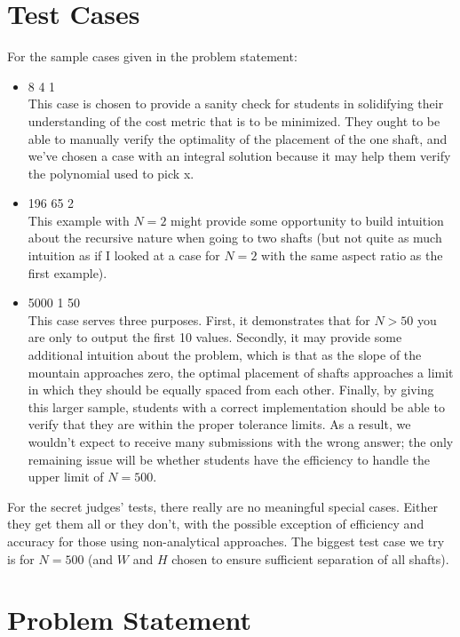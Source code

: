 \documentclass[12pt]{article}
\begin{document}
\section*{Test Cases}

For the sample cases given in the problem statement:
\begin{itemize}
\item 8 4 1\\
This case is chosen to provide a sanity check for students in
solidifying their understanding of the cost metric that is to be
minimized. They ought to be able to manually verify the optimality of
the placement of the one shaft, and we've chosen a case with an
integral solution because it may help them verify the polynomial used
to pick x.

\item  196 65 2\\
This example with $N=2$ might provide some opportunity to build
intuition about the recursive nature when going to two shafts (but not
quite as much intuition as if I looked at a case for $N=2$ with the
same aspect ratio as the first example).

\item 5000 1 50\\
This case serves three purposes. First, it demonstrates that for $N >
50$ you are only to output the first 10 values. Secondly, it may
provide some additional intuition about the problem, which is that as
the slope of the mountain approaches zero, the optimal placement of
shafts approaches a limit in which they should be equally spaced from
each other. Finally, by giving this larger sample, students with a
correct implementation should be able to verify that they are within
the proper tolerance limits. As a result, we wouldn't expect to
receive many submissions with the wrong answer; the only remaining
issue will be whether students have the efficiency to handle the upper
limit of $N=500$.
 
\end{itemize}

For the secret judges' tests, there really are no meaningful special
cases. Either they get them all or they don't, with the possible
exception of efficiency and accuracy for those using non-analytical
approaches. The biggest test case we try is for $N=500$ (and $W$ and
$H$ chosen to ensure sufficient separation of all shafts).


\section*{Problem Statement}
\end{document}
